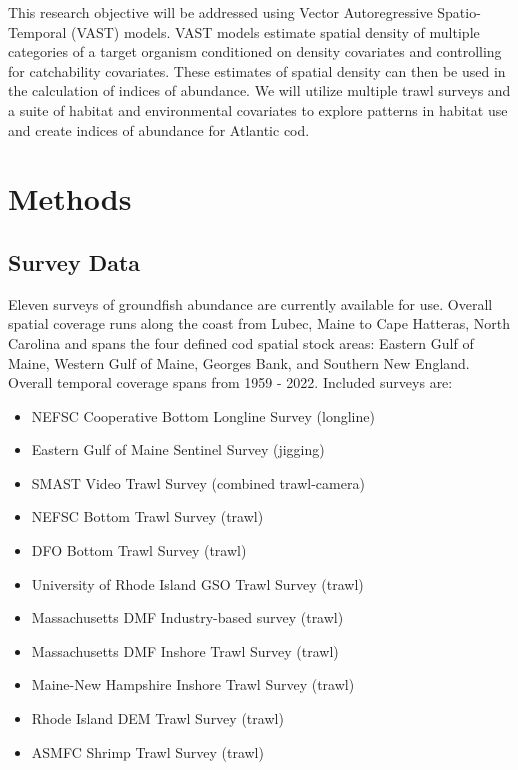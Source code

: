 \documentclass[
]{article}
\providecommand{\tightlist}{%
  \setlength{\itemsep}{0pt}\setlength{\parskip}{0pt}}
\begin{document}
This research objective will be addressed using Vector Autoregressive Spatio-Temporal (VAST) models. VAST models estimate spatial density of multiple categories of a target organism conditioned on density covariates and controlling for catchability covariates. These estimates of spatial density can then be used in the calculation of indices of abundance. We will utilize multiple trawl surveys and a suite of habitat and environmental covariates to explore patterns in habitat use and create indices of abundance for Atlantic cod.

\hypertarget{methods}{%
\section{Methods}\label{methods}}

\hypertarget{survey-data}{%
\subsection{Survey Data}\label{survey-data}}

Eleven surveys of groundfish abundance are currently available for use. Overall spatial coverage runs along the coast from Lubec, Maine to Cape Hatteras, North Carolina and spans the four defined cod spatial stock areas: Eastern Gulf of Maine, Western Gulf of Maine, Georges Bank, and Southern New England. Overall temporal coverage spans from 1959 - 2022. Included surveys are:

\begin{itemize}
\tightlist
\item
  NEFSC Cooperative Bottom Longline Survey (longline)
\item
  Eastern Gulf of Maine Sentinel Survey (jigging)
\item
  SMAST Video Trawl Survey (combined trawl-camera)
\item
  NEFSC Bottom Trawl Survey (trawl)
\item
  DFO Bottom Trawl Survey (trawl)
\item
  University of Rhode Island GSO Trawl Survey (trawl)
\item
  Massachusetts DMF Industry-based survey (trawl)
\item
  Massachusetts DMF Inshore Trawl Survey (trawl)
\item
  Maine-New Hampshire Inshore Trawl Survey (trawl)
\item
  Rhode Island DEM Trawl Survey (trawl)
\item
  ASMFC Shrimp Trawl Survey (trawl)
\end{itemize}
\end{document}
